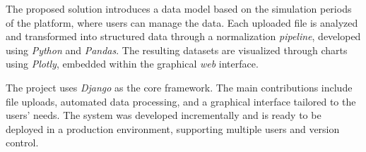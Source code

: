 The proposed solution introduces a data model based on the simulation periods of the platform, where users can manage the data. Each uploaded file is analyzed and transformed into structured data through a normalization \textit{pipeline}, developed using \textit{Python} and \textit{Pandas}. The resulting datasets are visualized through charts using \textit{Plotly}, embedded within the graphical \textit{web} interface.

The project uses \textit{Django} as the core framework. The main contributions include file uploads, automated data processing, and a graphical interface tailored to the users’ needs. The system was developed incrementally and is ready to be deployed in a production environment, supporting multiple users and version control.